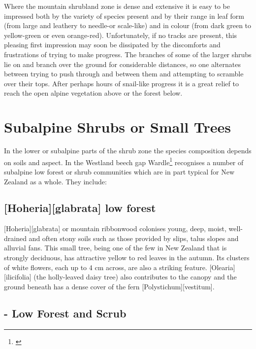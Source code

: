 Where the mountain shrubland zone is dense and extensive it is easy to be impressed both by the variety of species present and by their range in leaf form (from large and leathery to needle-or scale-like) and in colour (from dark green to yellow-green or even orange-red).
Unfortunately, if no tracks are present, this pleasing first impression may soon be dissipated by the discomforts and frustrations of trying to make progress.
The branches of some of the larger shrubs lie on and branch over the ground for considerable distances, so one alternates between trying to push through and between them and attempting to scramble over their tops.
After perhaps hours of snail-like progress it is a great relief to reach the open alpine vegetation above or the forest below.

\section{Subalpine Shrubs or Small Trees}

In the lower or subalpine parts of the shrub zone the species composition depends on soils and aspect.
In the Westland beech gap Wardle\footnote{\cite{wardle1977plant}} recognises a number of subalpine low forest or shrub communities which are in part typical for New Zealand as a whole.
They include:

\subsection[\emph{Hoheria glabrata} low forest]{[Hoheria][glabrata] low forest}

[Hoheria][glabrata] or mountain ribbonwood colonises young, deep, moist, well-drained and often stony soils such as those provided by slips, talus slopes and alluvial fans.
This small tree, being one of the few in New Zealand that is strongly deciduous, has attractive yellow to red leaves in the autumn.
Its clusters of white flowers, each up to 4 cm across, are also a striking feature. [Olearia][ilicifolia] (the holly-leaved daisy tree) also contributes to the canopy and the ground beneath has a dense cover of the fern [Polystichum][vestitum].

\subsection[\emph{Dracophyllum}-\emph{Olearia} Low Forest and Scrub]{- Low Forest and Scrub}

